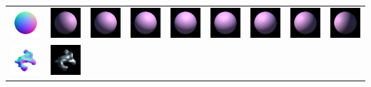 \begin{center}
\begin{longtable}{@{}c@{}c@{}c@{}c@{}c@{}c@{}c@{}c@{}c@{}}
\includegraphics[width=0.1\linewidth]{training/8_gt.png} & \includegraphics[width=0.1\linewidth]{training/8_0.png} &
\includegraphics[width=0.1\linewidth]{training/8_1.png} & \includegraphics[width=0.1\linewidth]{training/8_2.png} &
\includegraphics[width=0.1\linewidth]{training/8_3.png} & \includegraphics[width=0.1\linewidth]{training/8_4.png} &
\includegraphics[width=0.1\linewidth]{training/8_5.png} & \includegraphics[width=0.1\linewidth]{training/8_6.png} &
\includegraphics[width=0.1\linewidth]{training/8_7.png} \\
\includegraphics[width=0.1\linewidth]{training/9_gt.png} & \includegraphics[width=0.1\linewidth]{training/9_0.png} &

\end{longtable}
\end{center}
